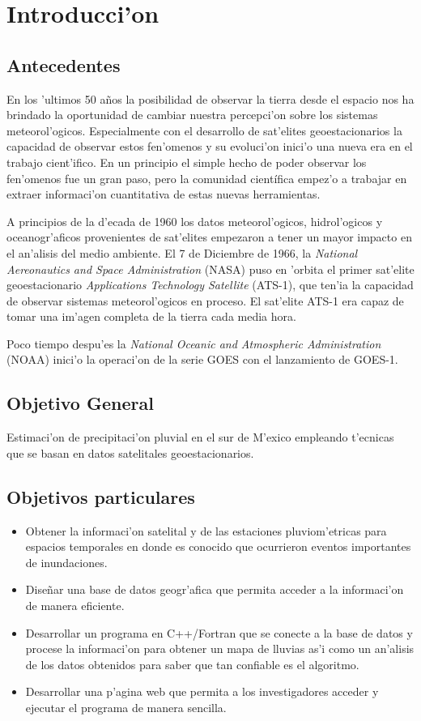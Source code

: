 \chapter{Introducci'on}
\section{Antecedentes}

En los 'ultimos 50 a\~nos la posibilidad de observar la tierra desde el espacio
nos ha brindado la oportunidad de cambiar nuestra percepci'on sobre los sistemas 
meteorol'ogicos. Especialmente con el desarrollo de sat'elites geoestacionarios 
la capacidad de observar estos fen'omenos y su evoluci'on inici'o una nueva era en 
el trabajo cient'ifico. En un principio el simple hecho de poder observar los fen'omenos
fue un gran paso, pero la comunidad científica empez'o a trabajar en extraer informaci'on
cuantitativa de estas nuevas herramientas.

A principios de la d'ecada de 1960 los datos meteorol'ogicos, hidrol'ogicos y oceanogr'aficos
provenientes de sat'elites empezaron a tener un mayor impacto en el an'alisis del medio 
ambiente. El 7 de Diciembre de 1966, la \textit{National Aereonautics and Space Administration} (NASA)
puso en 'orbita el primer sat'elite geoestacionario \textit{Applications Technology Satellite} (ATS-1),
que ten'ia la capacidad de observar sistemas meteorol'ogicos en proceso. El sat'elite ATS-1 era
capaz de tomar una im'agen completa de la tierra cada media hora.

Poco tiempo despu'es la \textit{National Oceanic and Atmospheric Administration} (NOAA) inici'o la
operaci'on de la serie GOES con el lanzamiento de GOES-1. 


\section{Objetivo General}
Estimaci'on de precipitaci'on pluvial en el sur de M'exico empleando
t'ecnicas que se basan en datos satelitales geoestacionarios.

\section{Objetivos particulares}
\begin{itemize}
 \item Obtener la informaci'on satelital y de las estaciones pluviom'etricas para espacios temporales en donde es 
conocido que ocurrieron eventos importantes de inundaciones.
 \item Dise\~nar una base de datos geogr'afica que permita acceder a la informaci'on de manera eficiente.
 \item Desarrollar un programa en C++/Fortran que se conecte a la base de datos y procese la informaci'on para obtener
un mapa de lluvias as'i como un an'alisis de los datos obtenidos para saber que tan confiable es el algoritmo.
 \item Desarrollar una p'agina web que permita a los investigadores acceder y ejecutar el programa de manera sencilla.
\end{itemize}
